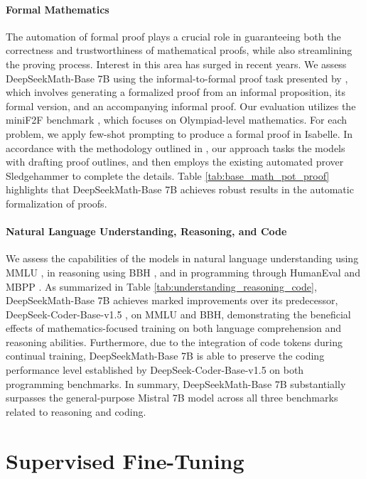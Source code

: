 \begin{itemize}[topsep=0pt]
\paragraph{Formal Mathematics}

The automation of formal proof plays a crucial role in guaranteeing both the correctness and trustworthiness of mathematical proofs, while also streamlining the proving process. Interest in this area has surged in recent years. We assess DeepSeekMath-Base 7B using the informal-to-formal proof task presented by \citep{dsp_proof}, which involves generating a formalized proof from an informal proposition, its formal version, and an accompanying informal proof. Our evaluation utilizes the miniF2F benchmark \citep{minif2f}, which focuses on Olympiad-level mathematics. For each problem, we apply few-shot prompting to produce a formal proof in Isabelle. In accordance with the methodology outlined in \cite{dsp_proof}, our approach tasks the models with drafting proof outlines, and then employs the existing automated prover Sledgehammer \citep{sledgehammer} to complete the details. Table \ref{tab:base_math_pot_proof} highlights that DeepSeekMath-Base 7B achieves robust results in the automatic formalization of proofs.

\paragraph{Natural Language Understanding, Reasoning, and Code}

We assess the capabilities of the models in natural language understanding using MMLU \citep{mmlu}, in reasoning using BBH \citep{bbh}, and in programming through HumanEval \citep{codex} and MBPP \citep{mbpp}. As summarized in Table \ref{tab:understanding_reasoning_code}, DeepSeekMath-Base 7B achieves marked improvements over its predecessor, DeepSeek-Coder-Base-v1.5 \citep{deepseek-coder}, on MMLU and BBH, demonstrating the beneficial effects of mathematics-focused training on both language comprehension and reasoning abilities. Furthermore, due to the integration of code tokens during continual training, DeepSeekMath-Base 7B is able to preserve the coding performance level established by DeepSeek-Coder-Base-v1.5 on both programming benchmarks. In summary, DeepSeekMath-Base 7B substantially surpasses the general-purpose Mistral 7B model \citep{mistral} across all three benchmarks related to reasoning and coding.

\section{Supervised Fine-Tuning}


\end{itemize}
